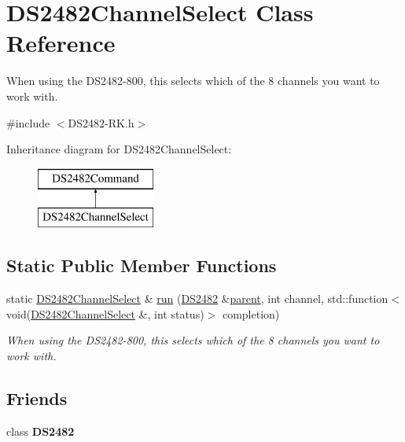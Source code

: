 \hypertarget{class_d_s2482_channel_select}{}\section{D\+S2482\+Channel\+Select Class Reference}
\label{class_d_s2482_channel_select}


When using the D\+S2482-\/800, this selects which of the 8 channels you want to work with.  




{\ttfamily \#include $<$D\+S2482-\/\+R\+K.\+h$>$}

Inheritance diagram for D\+S2482\+Channel\+Select\+:\begin{figure}[H]
\begin{center}
\leavevmode
\includegraphics[height=2.000000cm]{class_d_s2482_channel_select}
\end{center}
\end{figure}
\subsection*{Static Public Member Functions}
\begin{DoxyCompactItemize}
\item 
static \mbox{\hyperlink{class_d_s2482_channel_select}{D\+S2482\+Channel\+Select}} \& \mbox{\hyperlink{class_d_s2482_channel_select_a32cd9d686395cf5425790e9518664740}{run}} (\mbox{\hyperlink{class_d_s2482}{D\+S2482}} \&\mbox{\hyperlink{class_d_s2482_command_a54a41fb8a610ef2077f5e5377771aaf3}{parent}}, int channel, std\+::function$<$ void(\mbox{\hyperlink{class_d_s2482_channel_select}{D\+S2482\+Channel\+Select}} \&, int status)$>$ completion)
\begin{DoxyCompactList}\small\item\em When using the D\+S2482-\/800, this selects which of the 8 channels you want to work with. \end{DoxyCompactList}\end{DoxyCompactItemize}
\subsection*{Friends}
\begin{DoxyCompactItemize}
\item 
\mbox{\label{class_d_s2482_channel_select_afeaf69274324e8dbeebede05c02d9c18}} 
class {\bfseries D\+S2482}
\end{DoxyCompactItemize}
